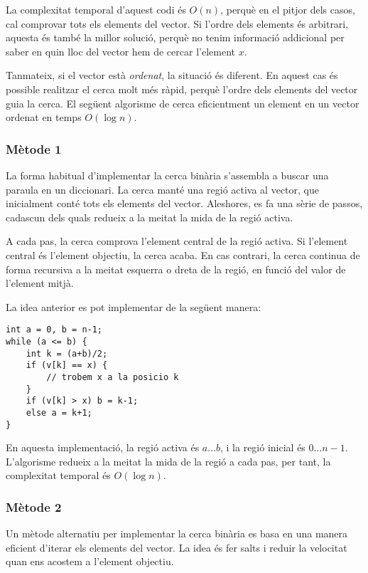 La complexitat temporal d'aquest codi és $O(n)$,
perquè en el pitjor dels casos, cal comprovar
tots els elements del vector.
Si l'ordre dels elements és arbitrari,
aquesta és també la millor solució, perquè
no tenim informació addicional per saber en quin
lloc del vector hem de cercar l'element $x$.

Tanmateix, si el vector està \emph{ordenat},
la situació és diferent.
En aquest cas és possible realitzar el
cerca molt més ràpid, perquè l'ordre dels
elements del vector guia la cerca.
El següent algorisme de 
cerca eficientment un element en un vector ordenat
en temps $O(\log n)$.

\subsubsection{Mètode 1}

La forma habitual d'implementar la cerca binària
s'assembla a buscar una paraula en un diccionari.
La cerca manté una regió activa al vector,
que inicialment conté tots els elements del vector.
Aleshores, es fa una sèrie de passos,
cadascun dels quals redueix a la meitat la mida de la regió
activa.

A cada pas, la cerca comprova l'element central
de la regió activa.
Si l'element central és l'element objectiu,
la cerca acaba.
En cas contrari, la cerca continua de forma recursiva
a la meitat esquerra o dreta de la regió,
en funció del valor de l'element mitjà.

La idea anterior es pot implementar de la següent manera:
\begin{lstlisting}
int a = 0, b = n-1;
while (a <= b) {
    int k = (a+b)/2;
    if (v[k] == x) {
        // trobem x a la posicio k
    }
    if (v[k] > x) b = k-1;
    else a = k+1;
}
\end{lstlisting}

En aquesta implementació, la regió activa és $a \ldots b$,
i la regió inicial és $0 \ldots n-1$.
L'algorisme redueix a la meitat la mida de la regió a cada pas,
per tant, la complexitat temporal és $O(\log n)$.

\subsubsection{Mètode 2}

Un mètode alternatiu per implementar la cerca binària
es basa en una manera eficient d'iterar
els elements del vector.
La idea és fer salts i reduir la velocitat
quan ens acostem a l'element objectiu.


